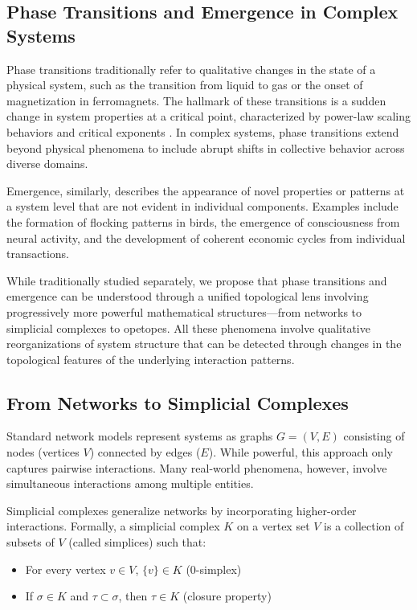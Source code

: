 \subsection{Phase Transitions and Emergence in Complex Systems}
Phase transitions traditionally refer to qualitative changes in the state of a physical system, such as the transition from liquid to gas or the onset of magnetization in ferromagnets. The hallmark of these transitions is a sudden change in system properties at a critical point, characterized by power-law scaling behaviors and critical exponents \citep{newman2003structure}. In complex systems, phase transitions extend beyond physical phenomena to include abrupt shifts in collective behavior across diverse domains.

Emergence, similarly, describes the appearance of novel properties or patterns at a system level that are not evident in individual components. Examples include the formation of flocking patterns in birds, the emergence of consciousness from neural activity, and the development of coherent economic cycles from individual transactions.

While traditionally studied separately, we propose that phase transitions and emergence can be understood through a unified topological lens involving progressively more powerful mathematical structures—from networks to simplicial complexes to opetopes. All these phenomena involve qualitative reorganizations of system structure that can be detected through changes in the topological features of the underlying interaction patterns.

\subsection{From Networks to Simplicial Complexes}
Standard network models represent systems as graphs $G = (V, E)$ consisting of nodes (vertices $V$) connected by edges ($E$). While powerful, this approach only captures pairwise interactions. Many real-world phenomena, however, involve simultaneous interactions among multiple entities.

Simplicial complexes generalize networks by incorporating higher-order interactions. Formally, a simplicial complex $K$ on a vertex set $V$ is a collection of subsets of $V$ (called simplices) such that:
\begin{itemize}
    \item For every vertex $v \in V$, $\{v\} \in K$ (0-simplex)
    \item If $\sigma \in K$ and $\tau \subset \sigma$, then $\tau \in K$ (closure property)
\end{itemize}

